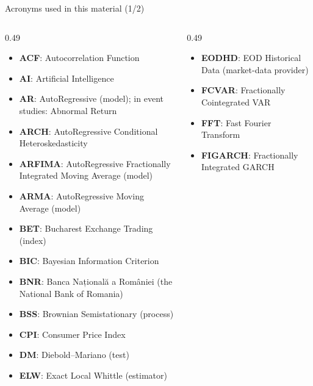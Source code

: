 {
\begin{frame}[noframenumbering]
    \titlepage
\end{frame}
}
\begin{frame}{Acronyms used in this material (1/2)}
\begin{columns}[T]
\begin{column}{0.49\textwidth}
\begin{itemize}\setlength{\itemsep}{0pt}
    \item \textbf{ACF}: Autocorrelation Function
    \item \textbf{AI}: Artificial Intelligence
    \item \textbf{AR}: AutoRegressive (model); in event studies: Abnormal Return
    \item \textbf{ARCH}: AutoRegressive Conditional Heteroskedasticity
    \item \textbf{ARFIMA}: AutoRegressive Fractionally Integrated Moving Average (model)
    \item \textbf{ARMA}: AutoRegressive Moving Average (model)
    \item \textbf{BET}: Bucharest Exchange Trading (index)
    \item \textbf{BIC}: Bayesian Information Criterion
    \item \textbf{BNR}: Banca Națională a României (the National Bank of Romania)
    \item \textbf{BSS}: Brownian Semistationary (process)
    \item \textbf{CPI}: Consumer Price Index
    \item \textbf{DM}: Diebold–Mariano (test)
    \item \textbf{ELW}: Exact Local Whittle (estimator)
\end{itemize}
\end{column}
\begin{column}{0.49\textwidth}
\begin{itemize}\setlength{\itemsep}{0pt}
    \item \textbf{EODHD}: EOD Historical Data (market-data provider)
    \item \textbf{FCVAR}: Fractionally Cointegrated VAR
    \item \textbf{FFT}: Fast Fourier Transform
    \item \textbf{FIGARCH}: Fractionally Integrated GARCH

\end{itemize}
\end{column}
\end{columns}
\end{frame}
